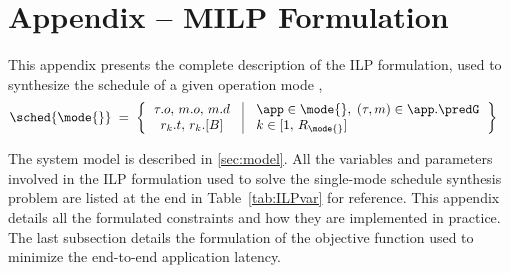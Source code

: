 
\section{Appendix -- MILP Formulation}
\label{appendix:single_mode}


This appendix presents the complete description of the ILP formulation, used to synthesize the schedule \sched{\mode{}} of a given operation mode \mode{}, \ie
\begin{align*}
&\sched{\mode{}} \; = \;
	\left\lbrace
	\begin{tabular}{c@{\quad}|@{\quad}l}
	$\tau.o, \, m.o, \, m.d$
	&
	$\app \in \mode{}, \;
	(\tau,m) \in \app.\predG$
	\\
	$r_k.t, \, r_k.[B]$
	&
	$k \in [1, \, R_{\mode{}}]$
	\end{tabular}
	\right\rbrace
\end{align*}


The system model is described in \cref{sec:model}. All the variables and parameters involved in the ILP formulation used to solve the single-mode schedule synthesis problem are listed at the end in Table~\ref{tab:ILPvar} for reference.
This appendix details all the formulated constraints and how they are implemented in practice. The last subsection details the formulation of the objective function used to minimize the end-to-end application latency.

